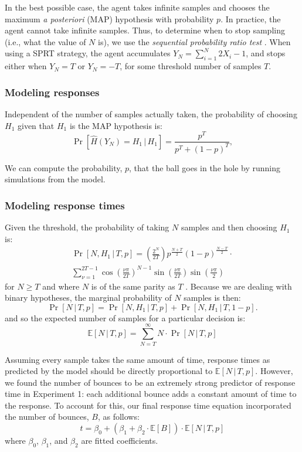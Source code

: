 \documentclass[10pt,letterpaper]{article}
\begin{document}
In the best possible case, the agent takes infinite samples and chooses the maximum \emph{a posteriori} (MAP) hypothesis with probability $p$. In practice, the agent cannot take infinite samples. Thus, to determine when to stop sampling (i.e., what the value of $N$ is), we use the \emph{sequential probability ratio test} \cite{wald1947sequential}. When using a SPRT strategy, the agent accumulates $Y_N=\sum_{i=1}^N 2X_i-1$, and stops either when $Y_N=T$ or $Y_N=-T$, for some threshold number of samples $T$. 

\subsubsection{Modeling responses} Independent of the number of samples actually taken, the probability of choosing $H_1$ given that $H_1$ is the MAP hypothesis is:
\begin{equation}
\Pr[\hat{H}(Y_N)=H_1\,|\,H_1]=\frac{p^T}{p^T+(1-p)^T},
\label{eq:pr-choose-h1}
\end{equation}

We can compute the probability, $p$, that the ball goes in the hole by running simulations from the model.

\subsubsection{Modeling response times} Given the threshold, the probability of taking $N$ samples and then choosing $H_1$ is:
\begin{multline}
\Pr[N,H_1\,|\,T,p]=\left(\frac{2^N}{2T}\right)p^{\frac{N+T}{2}}(1-p)^{\frac{N-T}{2}}\cdot{}\\
\sum_{\nu=1}^{2T-1}\cos\left(\frac{\nu\pi}{2T}\right)^{N-1}\sin\left(\frac{\nu\pi}{2T}\right)\sin\left(\frac{\nu\pi}{2}\right)
\end{multline}
for $N\geq T$ and where $N$ is of the same parity as $T$ \cite[ch.~XIV, eq. 5.7]{Feller:1968ut}. Because we are dealing with binary hypotheses, the marginal probability of $N$ samples is then:
\begin{equation}
\Pr[N\,|\,T,p]=\Pr[N,H_1\,|\,T,p]+\Pr[N,H_1\,|\,T,1-p].
\label{eq:pr-n}
\end{equation}
and so the expected number of samples for a particular decision is:
\begin{equation}
\mathbb{E}[N\,|\,T,p]=\sum_{N=T}^\infty N\cdot{}\Pr[N\,|\,T,p]
\end{equation}

Assuming every sample takes the same amount of time, response times as predicted by the model should be directly proportional to $\mathbb{E}[N\,|\,T,p]$. However, we found the number of bounces to be an extremely strong predictor of response time in Experiment 1: each additional bounce adds a constant amount of time to the response. To account for this, our final response time equation incorporated the number of bounces, $B$, as follows:
\begin{equation}
t = \beta_0 + (\beta_1 + \beta_2\cdot{}\mathbb{E}[B]) \cdot{}\mathbb{E}[N\,|\,T,p]
\label{eq:rt}
\end{equation}
where $\beta_0$, $\beta_1$, and $\beta_2$ are fitted coefficients.
\end{document}
